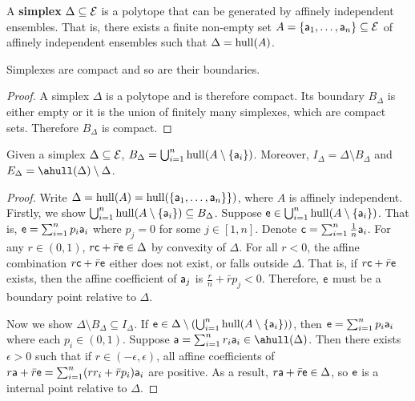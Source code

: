 \begin{mathSection}
\begin{defn}
	A \textbf{simplex} $\Delta \subseteq \Ens$ is a polytope that can be generated by affinely independent ensembles. That is, there exists a finite non-empty set $A = \{\ens[a]_1, \dots, \ens[a]_n\} \subseteq \Ens$ of affinely independent ensembles such that $\Delta = \hull(A)$.
\end{defn}

\begin{coro}
	Simplexes are compact and so are their boundaries.
\end{coro}

\begin{proof}
	A simplex $\Delta$ is a polytope and is therefore compact. Its boundary $B_{\Delta}$ is either empty or it is the union of finitely many simplexes, which are compact sets. Therefore $B_{\Delta}$ is compact.
\end{proof}

\begin{prop}
	Given a simplex $\Delta \subseteq \Ens$, $B_\Delta=\bigcup_{i=1}^{n} \hull(A\setminus\{\ens[a]_i\})$. Moreover, $I_{\Delta} = \Delta \setminus B_{\Delta}$ and $E_{\Delta} = \ahull(\Delta) \setminus \Delta$.
\end{prop}

\begin{proof}
	Write $\Delta = \hull(A) = \hull(\{\ens[a]_1, \ldots, \ens[a]_n\}\})$, where $A$ is affinely independent. Firstly, we show $\bigcup_{i=1}^{n} \hull(A\setminus\{\ens[a]_i\}) \subseteq B_\Delta$. Suppose $\ens[e] \in \bigcup_{i=1}^{n} \hull(A\setminus\{\ens[a]_i\})$. That is, $\ens[e] = \sum_{i=1}^n p_i\ens[a]_i$ where $p_j = 0$ for some $j \in [1,n]$. Denote $\ens[c] = \sum_{i=1}^n \frac{1}{n}\ens[a]_i$. For any $r \in (0,1)$, $r\ens[c] + \bar{r}\ens[e] \in \Delta$ by convexity of $\Delta$. For all $r < 0$, the affine combination $r\ens[c] + \bar{r}\ens[e]$ either does not exist, or falls outside $\Delta$. That is, if $r\ens[c] + \bar{r}\ens[e]$ exists, then the affine coefficient of $\ens[a]_j$ is $\frac{r}{n} + \bar{r}p_j < 0$. Therefore, $\ens[e]$ must be a boundary point relative to $\Delta$.
	
	Now we show $\Delta \setminus B_{\Delta} \subseteq I_{\Delta}$. If $\ens[e] \in \Delta \setminus \left(\bigcup_{i=1}^{n} \hull(A\setminus\{\ens[a]_i\})\right)$, then $\ens[e] = \sum_{i=1}^n p_i\ens[a]_i$ where each $p_i \in (0,1)$. Suppose $\ens[a] = \sum_{i=1}^n r_i\ens[a]_i \in \ahull(\Delta)$. Then there exists $\epsilon > 0$ such that if $r \in (-\epsilon, \epsilon)$, all affine coefficients of $r\ens[a] + \bar{r}\ens[e] = \sum_{i=1}^n (rr_i + \bar{r}p_i)\ens[a]_i$ are positive. As a result, $r\ens[a] + \bar{r}\ens[e] \in \Delta$, so $\ens[e]$ is a internal point relative to $\Delta$.
	

\end{proof}
\end{mathSection}
